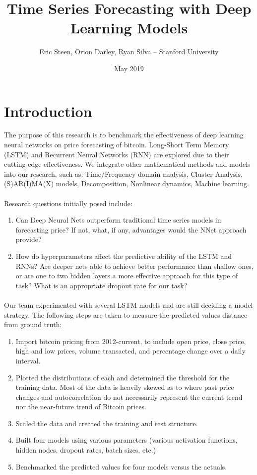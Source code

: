 \documentclass{article}
\title{Time Series Forecasting with Deep Learning Models}
\author{Eric Steen, Orion Darley, Ryan Silva – Stanford University }
\date{May 2019}
\begin{document}
\maketitle

\section{Introduction}
The purpose of this research is to benchmark the effectiveness of deep learning neural networks on price forecasting of bitcoin. Long-Short Term Memory (LSTM) and Recurrent Neural Networks (RNN) are explored due to their cutting-edge effectiveness. We integrate other mathematical methods and models into our research, such as: Time/Frequency domain analysis, Cluster Analysis, (S)AR(I)MA(X) models, Decomposition, Nonlinear dynamics, Machine learning.

\paragraph{}
Research questions initially posed include:
\begin{enumerate}
    \item Can Deep Neural Nets outperform traditional time series models in forecasting price? If not, what, if any, advantages would the NNet approach provide?
    \item How do hyperparameters affect the predictive ability of the LSTM and RNNs? Are deeper nets able to achieve better performance than shallow ones, or are one to two hidden layers a more effective approach for this type of task? What is an appropriate dropout rate for our task?
\end{enumerate}

\paragraph{}
Our team experimented with several LSTM models and are still deciding a model strategy. The following steps are taken to measure the predicted values distance from ground truth:

\begin{enumerate}
\item Import bitcoin pricing from 2012-current, to include open price, close price, high and low prices, volume transacted, and percentage change over a daily interval.
\item Plotted the distributions of each and determined the threshold for the training data. Most of the data is heavily skewed as to where past price changes and autocorrelation do not necessarily represent the current trend nor the near-future trend of Bitcoin prices.
\item Scaled the data and created the training and test structure.
\item Built four models using various parameters (various activation functions, hidden nodes, dropout rates, batch sizes, etc.)
\item Benchmarked the predicted values for four models versus the actuals.
\end{enumerate}
\end{document}
